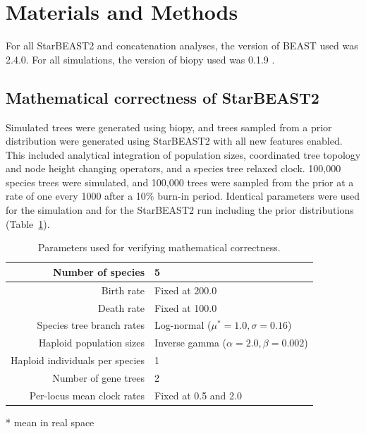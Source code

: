 \documentclass[12pt]{article}
\begin{document}
\section*{Materials and Methods}

For all StarBEAST2 and concatenation analyses, the version of BEAST used was
2.4.0. For all simulations, the version of biopy used was 0.1.9 \citep{biopy}.

\subsection*{Mathematical correctness of StarBEAST2}

Simulated trees were generated using biopy, and trees sampled from
a prior distribution were generated using StarBEAST2 with all new features
enabled. This included analytical integration of population sizes, coordinated
tree topology and node height changing operators, and a species tree relaxed
clock. 100,000 species trees were simulated, and 100,000 trees were sampled from
the prior at a rate of one every 1000 after a 10\% burn-in period. Identical
parameters were used for the simulation and for the StarBEAST2 run including the
prior distributions (Table~\ref{tab:correctParameters}).

\begin{table}[htb!]
\centering
\caption{Parameters used for verifying mathematical correctness.}
\label{tab:correctParameters}
\begin{threeparttable}
\begin{adjustbox}{center}
\begin{tabular}{|r|l|}
\hline
Number of species & 5\tabularnewline
\hline
Birth rate & Fixed at 200.0\tabularnewline
\hline
Death rate & Fixed at 100.0\tabularnewline
\hline
Species tree branch rates & Log-normal ($\mu^* = 1.0, \sigma = 0.16$)\tabularnewline
\hline
Haploid population sizes & Inverse gamma ($\alpha = 2.0, \beta = 0.002$)\tabularnewline
\hline
Haploid individuals per species & 1\tabularnewline
\hline
Number of gene trees & 2\tabularnewline
\hline
Per-locus mean clock rates & Fixed at 0.5 and 2.0\tabularnewline
\hline
\end{tabular}
\end{adjustbox}
\begin{tablenotes}
\small
\item \hspace{2cm} * mean in real space
\end{tablenotes}
\end{threeparttable}
\end{table}
\end{document}
